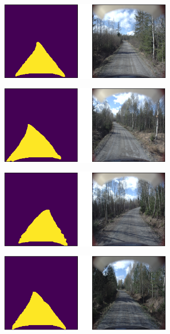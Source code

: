 \documentclass[USenglish]{ifimaster}  %
\begin{document}
\begin{appendices}
\begin{figure}[ht]
\centering
\begin{subfigure}[b]{\textwidth}
\centering
\includegraphics[width=0.95\textwidth]{bilder/appendix_2/486.png}
\end{subfigure}
\hfill
\begin{subfigure}[b]{\textwidth}
\centering
\includegraphics[width=0.95\textwidth]{bilder/appendix_2/582.png}
\end{subfigure}
\hfill
\begin{subfigure}[b]{\textwidth}
\centering
\includegraphics[width=0.95\textwidth]{bilder/appendix_2/701.png}
\end{subfigure}
\hfill
\begin{subfigure}[b]{\textwidth}
\centering
\includegraphics[width=0.95\textwidth]{bilder/appendix_2/772.png}
\end{subfigure}
\end{figure}



\end{appendices}
\end{document}
